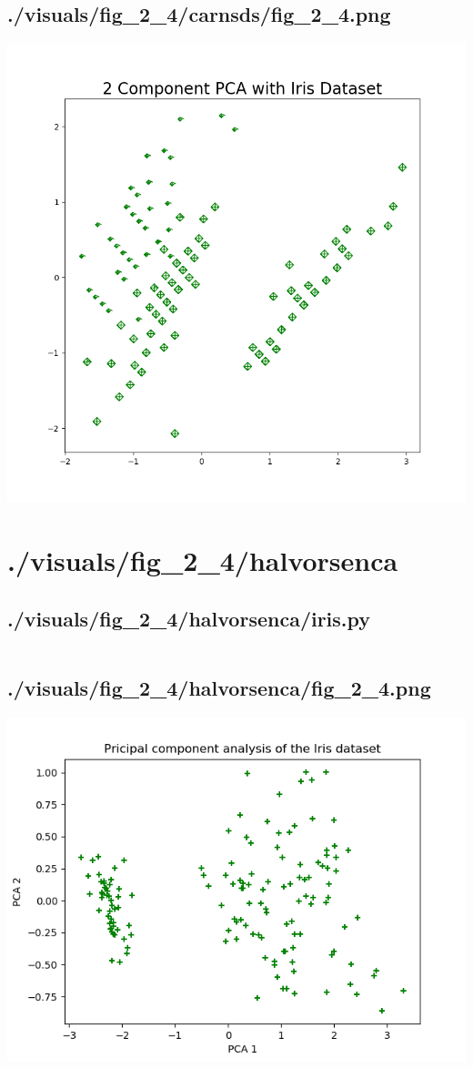 \documentclass{report}
\begin{document}
    \subsection{./visuals/fig\_2\_4/carnsds/fig\_2\_4.png}
    \includegraphics[width=\textwidth]{.././visuals/fig_2_4/carnsds/fig_2_4.png}
    \pagebreak
    \section{./visuals/fig\_2\_4/halvorsenca}
    \subsection{./visuals/fig\_2\_4/halvorsenca/iris.py}
    \inputminted[breaklines=true]{python}{.././visuals/fig_2_4/halvorsenca/iris.py}
    \subsection{./visuals/fig\_2\_4/halvorsenca/fig\_2\_4.png}
    \includegraphics[width=\textwidth]{.././visuals/fig_2_4/halvorsenca/fig_2_4.png}
    \pagebreak
\end{document}
